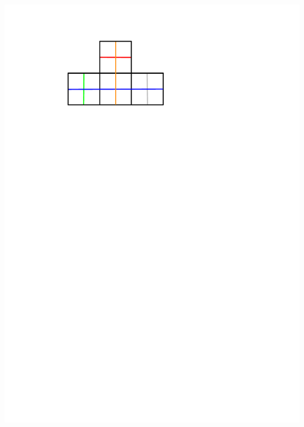 \documentclass[portrait,final,a0paper,fontscale=0.25]{baposter}
\theoremstyle{definition}
\begin{document}
\begin{poster}
{\hspace*{.1cm}\includegraphics[scale=.32]{StraightWalks}
}
\end{poster}
\end{document}
